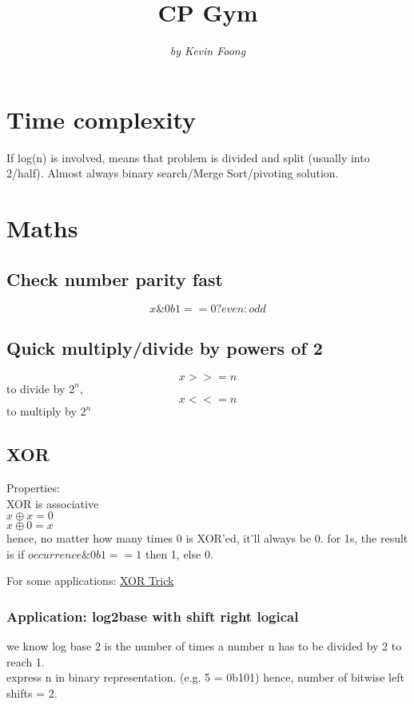 \documentclass[12pt]{article}
\begin{document}
\title{\textbf{CP Gym}} 
\author{\textit{by Kevin Foong}} 
\date{}
\maketitle

\section{Time complexity} 
If log(n) is involved, means that problem is divided and split (usually into 2/half). Almost always binary search/Merge Sort/pivoting solution. 

\section{Maths} 

\subsection{Check number parity fast}
\[ x \& 0b1 == 0 ? even : odd\]

\subsection{Quick multiply/divide by powers of 2} 
\[ x >>= n\] to divide by \(2^n\), \[ x <<= n \] to multiply by \(2^n\)

\subsection{XOR}
Properties: \\
XOR is associative \\
\( x \oplus x = 0 \) \\
\( x \oplus 0 = x \)\\
hence, no matter how many times 0 is XOR'ed, it'll always be 0. 
for 1s, the result is if \( occurrence \& 0b1 == 1 \) then 1, else 0.

For some applications: \href{https://florian.github.io/xor-trick/}{XOR Trick} 


\subsubsection{Application: log2base with shift right logical}
we know log base 2 is the number of times a number n has to be divided by 2 to reach 1. \\ 
express n in binary representation. (e.g. 5 = 0b101)
hence, number of bitwise left shifts = 2. \\ [\baselineskip] 
\end{document}
